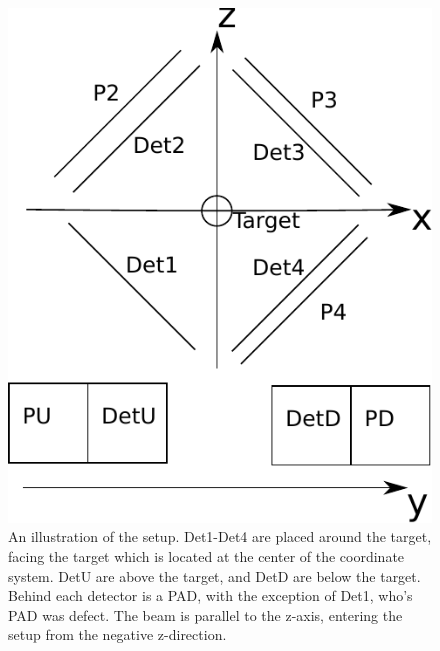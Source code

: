 \begin{figure}[H]
	\centering
	\includegraphics[width=.6\linewidth]{../figures/opstilling_better.pdf}
	\caption{An illustration of the setup. Det1-Det4 are placed around the target, facing the target which is located at the center of the coordinate system. DetU are above the target, and DetD are below the target. Behind each detector is a PAD, with the exception of Det1, who's PAD was defect. The beam is parallel to the z-axis, entering the setup from the negative z-direction.}
	\label{fig:opstilling}
\end{figure}

